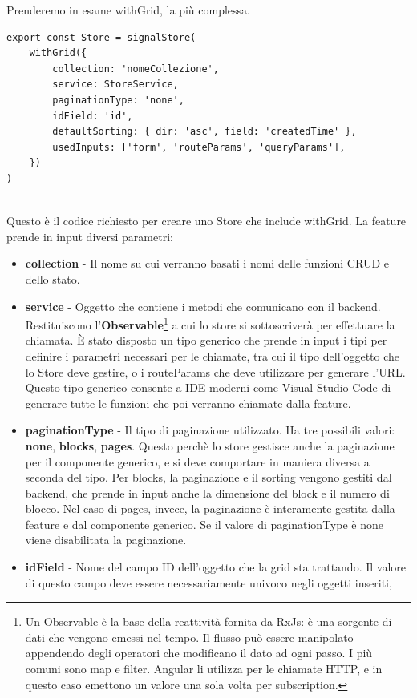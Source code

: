 Prenderemo in esame withGrid, la pi\`u complessa.
\\
\begin{lstlisting}
export const Store = signalStore(
    withGrid({
        collection: 'nomeCollezione',
        service: StoreService,
        paginationType: 'none',
        idField: 'id',
        defaultSorting: { dir: 'asc', field: 'createdTime' },
        usedInputs: ['form', 'routeParams', 'queryParams'],
    })
)
\end{lstlisting}
\textbf{}\\
Questo \`e il codice richiesto per creare uno Store che include withGrid. La feature prende in input diversi parametri:
\begin{itemize}
  \item \textbf{collection} - Il nome su cui verranno basati i nomi delle funzioni CRUD e dello stato.
  \item \textbf{service} - Oggetto che contiene i metodi che comunicano con il backend. Restituiscono
    l'\textbf{Observable}\footnote{Un Observable \`e la base della reattivit\`a fornita da RxJs: \`e una sorgente di dati che vengono emessi nel tempo.
      Il flusso pu\`o essere manipolato appendendo degli operatori che modificano il dato ad ogni passo. I pi\`u comuni sono map e filter.
    Angular li utilizza per le chiamate HTTP, e in questo caso emettono un valore una sola volta per subscription.}
    a cui lo store si sottoscriver\`a
    per effettuare la chiamata. \`E stato disposto un tipo generico che prende in input i tipi per definire i parametri necessari per le chiamate, tra cui il tipo
    dell'oggetto che lo Store deve gestire, o i routeParams che deve utilizzare per generare l'URL. Questo tipo generico consente a IDE moderni come Visual Studio Code di
    generare tutte le funzioni che poi verranno chiamate dalla feature.
  \item \textbf{paginationType} - Il tipo di paginazione utilizzato. Ha tre possibili valori: \textbf{none}, \textbf{blocks}, \textbf{pages}. Questo perch\`e lo store
    gestisce anche la paginazione per il componente generico, e si deve comportare in maniera diversa a seconda del tipo. Per blocks, la paginazione e il sorting
    vengono gestiti dal backend, che prende in input anche la dimensione del block e il numero di blocco. Nel caso di pages, invece, la paginazione \`e interamente gestita
    dalla feature e dal componente generico. Se il valore di paginationType \`e none viene disabilitata la paginazione.
  \item \textbf{idField} - Nome del campo ID dell'oggetto che la grid sta trattando. Il valore di questo campo deve essere necessariamente univoco negli oggetti inseriti,

\end{itemize}
